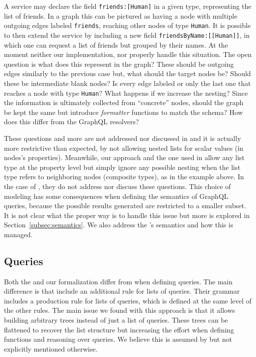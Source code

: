 A service may declare the field \texttt{friends:[Human]} in a given type, representing the list of friends.
In a graph this can be pictured as having a node with multiple outgoing edges labeled \texttt{friends}, reaching other nodes of type \texttt{Human}. It is possible to then extend the service by including a new field \texttt{friendsByName:[[Human]]}, in which one can request a list of friends but grouped by their names. At the moment neither our implementation, \HP{} nor \cite{olafschema} properly handle this situation. The open question is what does this represent in the graph? These should be outgoing edges similarly to the previous case but, what should the target nodes be? Should these be intermediate blank nodes? Is every edge labeled or only the last one that reaches a node with type \texttt{Human}? What happens if we increase the nesting? Since the information is ultimately collected from ``concrete'' nodes, should the graph be kept the same but introduce \textit{formatter} functions to match the schema? How does this differ from the GraphQL resolvers?

These questions and more are not addressed nor discussed in \HP{} and it is actually more restrictive than expected, by not allowing nested lists for scalar values (in nodes's properties). Meanwhile, our approach and the one used in \cite{olafschema} allow any list type at the property level but simply ignore any possible nesting when the list type refers to neighboring nodes (composite types), as in the example above. In the case of \cite{olafschema}, they do not address nor discuss these questions. This choice of modeling has some consequences when defining the semantics of GraphQL queries, because the possible results generated are restricted to a smaller subset. It is not clear what the proper way is to handle this issue but more is explored in Section~\ref{subsec:semantics}. We also address the \spec{}'s semantics and how this is managed.

\subsection{Queries}


Both the \spec{} and our formalization differ from \HP{} when defining queries. The main difference is that \HP{} include an additional rule for lists of queries. Their grammar includes a production rule for lists of queries, which is defined at the same level of the other rules. The main issue we found with this approach is that it allows building arbitrary trees instead of just a list of queries. These trees can be flattened to recover the list structure but increasing the effort when defining functions and reasoning over queries. We believe this is assumed by \HP{} but not explicitly mentioned otherwise.


